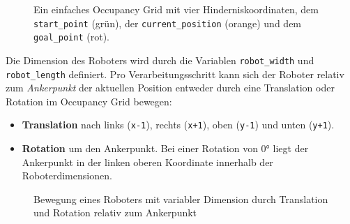 \begin{figure}[H]
\begin{minipage}{0.35\textwidth}
	\end{minipage}
	\hspace*{\fill}
	\caption{Ein einfaches Occupancy Grid mit vier Hinderniskoordinaten, dem \texttt{start\_point} (grün), der \texttt{current\_position} (orange) und dem \texttt{goal\_point} (rot).}
\end{figure}

\vspace*{-0.3cm}
Die Dimension des Roboters wird durch die Variablen \texttt{robot\_width} und \texttt{robot\_length} definiert. Pro Verarbeitungsschritt kann sich der Roboter relativ zum \textit{Ankerpunkt} der aktuellen Position entweder durch eine Translation oder Rotation im Occupancy Grid bewegen:
\begin{itemize}
\item \textbf{Translation} nach links (\texttt{x-1}), rechts (\texttt{x+1}), oben (\texttt{y-1}) und unten (\texttt{y+1}).
\item \textbf{Rotation} um den Ankerpunkt. Bei einer Rotation von $0$° liegt der Ankerpunkt in der linken oberen Koordinate innerhalb der Roboterdimensionen.
\end{itemize}
\vspace*{0.2cm}
\begin{figure}[H]
	\centering
	\footnotesize
	\centerline{\resizebox{1\linewidth}{!}{}}
	\caption{Bewegung eines Roboters mit variabler Dimension durch Translation und Rotation relativ zum Ankerpunkt}
\end{figure}

